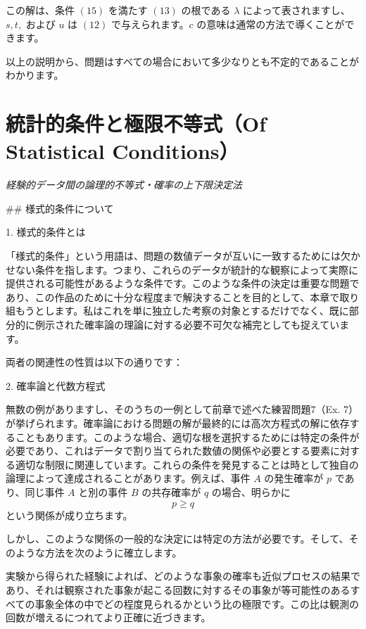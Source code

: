 \documentclass[a4paper,11pt,openany]{ltjsbook}
\begin{document}
この解は、条件 $(15)$ を満たす $(13)$ の根である $\lambda$ によって表されますし、$s, t,$ および $u$ は $(12)$ で与えられます。$c$ の意味は通常の方法で導くことができます。

以上の説明から、問題はすべての場合において多少なりとも不定的であることがわかります。

\newpage

\chapter{統計的条件と極限不等式（Of Statistical Conditions）}
\label{ch:xix}

\begin{center}
\large\textit{経験的データ間の論理的不等式・確率の上下限決定法}
\end{center}
\vspace{4mm}

\#\# 様式的条件について

1. 様式的条件とは

「様式的条件」という用語は、問題の数値データが互いに一致するためには欠かせない条件を指します。つまり、これらのデータが統計的な観察によって実際に提供される可能性があるような条件です。このような条件の決定は重要な問題であり、この作品のために十分な程度まで解決することを目的として、本章で取り組もうとします。私はこれを単に独立した考察の対象とするだけでなく、既に部分的に例示された確率論の理論に対する必要不可欠な補完としても捉えています。

両者の関連性の性質は以下の通りです：

2. 確率論と代数方程式

無数の例がありますし、そのうちの一例として前章で述べた練習問題7（Ex. 7）が挙げられます。確率論における問題の解が最終的には高次方程式の解に依存することもあります。このような場合、適切な根を選択するためには特定の条件が必要であり、これはデータで割り当てられた数値の関係や必要とする要素に対する適切な制限に関連しています。これらの条件を発見することは時として独自の論理によって達成されることがあります。例えば、事件 $A$ の発生確率が $p$ であり、同じ事件 $A$ と別の事件 $B$ の共存確率が $q$ の場合、明らかに
\[
p \ge q
\]
という関係が成り立ちます。

しかし、このような関係の一般的な決定には特定の方法が必要です。そして、そのような方法を次のように確立します。

実験から得られた経験によれば、どのような事象の確率も近似プロセスの結果であり、それは観察された事象が起こる回数に対するその事象が等可能性のあるすべての事象全体の中でどの程度見られるかという比の極限です。この比は観測の回数が増えるにつれてより正確に近づきます。
\end{document}

